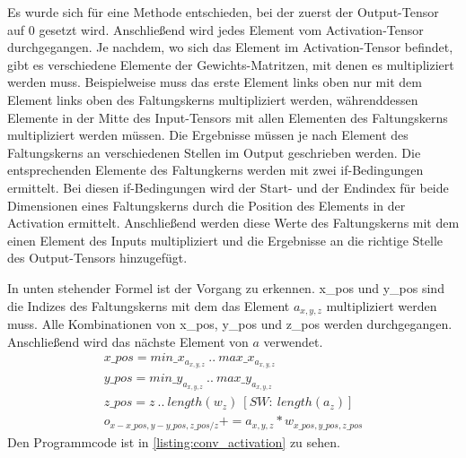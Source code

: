 \documentclass[../main.tex]{subfiles}
\begin{document}
Es wurde sich für eine Methode entschieden, bei der zuerst der Output-Tensor auf 0 gesetzt wird. Anschließend wird jedes Element vom Activation-Tensor durchgegangen. Je nachdem, wo sich das Element im Activation-Tensor befindet, gibt es verschiedene Elemente der Gewichts-Matritzen, mit denen es multipliziert werden muss. Beispielweise muss das erste Element links oben nur mit dem Element links oben des Faltungskerns multipliziert werden, währenddessen Elemente in der Mitte des Input-Tensors mit allen Elementen des Faltungskerns multipliziert werden müssen. Die Ergebnisse müssen je nach Element des Faltungskerns an verschiedenen Stellen im Output geschrieben werden.
Die entsprechenden Elemente des Faltungkerns werden mit zwei if-Bedingungen ermittelt. Bei diesen if-Bedingungen wird der Start- und der Endindex für beide Dimensionen eines Faltungskerns durch die Position des Elements in der Activation ermittelt. Anschließend werden diese Werte des Faltungskerns mit dem einen Element des Inputs multipliziert und die Ergebnisse an die richtige Stelle des Output-Tensors hinzugefügt.

In unten stehender Formel ist der Vorgang zu erkennen. x\_pos und y\_pos sind die Indizes des Faltungskerns mit dem das Element \(a_{x,y,z}\) multipliziert werden muss. Alle Kombinationen von x\_pos, y\_pos und z\_pos werden durchgegangen. Anschließend wird das nächste Element von \(a\) verwendet.
\begin{equation}
\begin{split}
x\_pos = {min\_x_{a_{x,y,z}}\ ..\ max\_x_{a_{x,y,z}}}\\
y\_pos = {min\_y_{a_{x,y,z}}\ ..\ max\_y_{a_{x,y,z}}}\\
z\_pos = {z\ ..\ length(w_{z})\ [SW:\ length(a_{z})]}\\
o_{x-x\_pos,y-y\_pos,z\_pos/z} += a_{x,y,z}*w_{x\_pos,y\_pos,z\_pos}
\end{split}
\end{equation}
Den Programmcode ist in \ref{listing:conv_activation} zu sehen.
\end{document}
